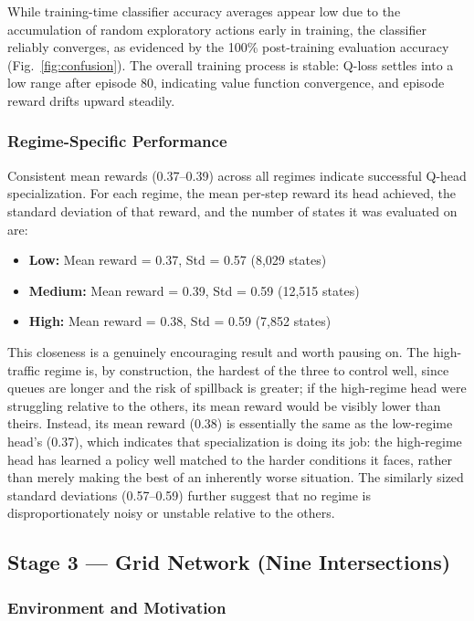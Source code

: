 \documentclass[lettersize,journal]{IEEEtran}
\begin{document}
While training-time classifier accuracy averages appear low due to the accumulation of random exploratory actions early in training, the classifier reliably converges, as evidenced by the 100\% post-training evaluation accuracy (Fig.~\ref{fig:confusion}). The overall training process is stable: Q-loss settles into a low range after episode 80, indicating value function convergence, and episode reward drifts upward steadily.

\subsubsection{Regime-Specific Performance}

Consistent mean rewards (0.37--0.39) across all regimes indicate successful
Q-head specialization. For each regime, the mean per-step reward its head
achieved, the standard deviation of that reward, and the number of states
it was evaluated on are:
\begin{itemize}
    \item \textbf{Low:}    Mean reward = 0.37, Std = 0.57 (8{,}029 states)
    \item \textbf{Medium:} Mean reward = 0.39, Std = 0.59 (12{,}515 states)
    \item \textbf{High:}   Mean reward = 0.38, Std = 0.59 (7{,}852 states)
\end{itemize}
This closeness is a genuinely encouraging result and worth pausing on. The
high-traffic regime is, by construction, the hardest of the three to
control well, since queues are longer and the risk of spillback is
greater; if the high-regime head were struggling relative to the others,
its mean reward would be visibly lower than theirs. Instead, its mean
reward (0.38) is essentially the same as the low-regime head's (0.37),
which indicates that specialization is doing its job: the high-regime head
has learned a policy well matched to the harder conditions it faces,
rather than merely making the best of an inherently worse situation. The
similarly sized standard deviations (0.57--0.59) further suggest that no
regime is disproportionately noisy or unstable relative to the others.

\subsection{Stage 3 --- Grid Network (Nine Intersections)}
\label{sec:stage3}

\subsubsection{Environment and Motivation}
\end{document}

